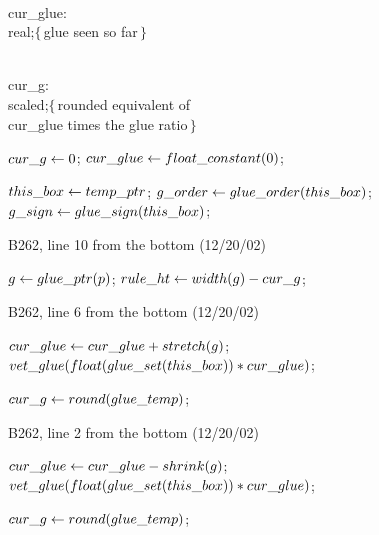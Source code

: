 {{\ninepoint\noindent
\qquad\\{cur\_glue}: \\{real};\quad$\{\,$glue seen so far$\,\}$\par\noindent
\qquad\\{cur\_g}: \\{scaled};\quad$\{\,$rounded
  equivalent of \\{cur\_glue} times the glue ratio$\,\}$\par\noindent
{} $\\{cur\_g}\gets0$;
  $\\{cur\_glue}\gets\\{float\_constant}(0)$;\par\noindent
\quad$\\{this\_box}\gets\\{temp\_ptr}$;
 $\\{g\_order}\gets\\{glue\_order}(\\{this\_box})$;
 $\\{g\_sign}\gets\\{glue\_sign}(\\{this\_box})$;

\bugonpage B262, line 10 from the bottom (12/20/02)

\ninepoint\noindent
{} $g\gets\\{glue\_ptr}(p)$;
  $\\{rule\_ht}\gets\\{width}(g)-\\{cur\_g}$;

\bugonpage B262, line 6 from the bottom (12/20/02)

\ninepoint\noindent
\qquad{} $\\{cur\_glue}\gets\\{cur\_glue}+\\{stretch}(g)$;
 $\\{vet\_glue}(\\{float}(\\{glue\_set}(\\{this\_box}))*\\{cur\_glue})$;\par
\noindent\qquad\qquad$\\{cur\_g}\gets\\{round}(\\{glue\_temp})$;

\bugonpage B262, line 2 from the bottom (12/20/02)

\ninepoint\noindent
\qquad{} $\\{cur\_glue}\gets\\{cur\_glue}-\\{shrink}(g)$;
 $\\{vet\_glue}(\\{float}(\\{glue\_set}(\\{this\_box}))*\\{cur\_glue})$;\par
\noindent\qquad\qquad$\\{cur\_g}\gets\\{round}(\\{glue\_temp})$;

}}

